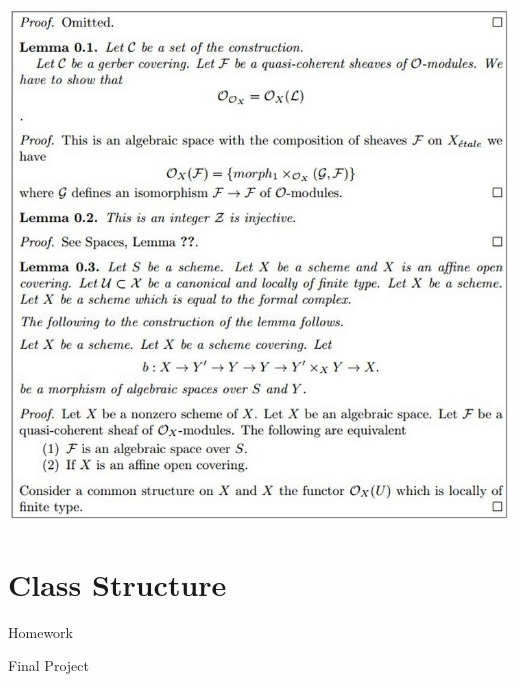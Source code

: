 \documentclass{beamer}
\begin{document}
\begin{frame}

\includegraphics{../latex3}
\end{frame}


\section{Class Structure}

\begin{frame}
  
\end{frame}

\begin{frame}{Homework}
  
\end{frame}


\begin{frame}{Final Project}
  
\end{frame}
\end{document}
